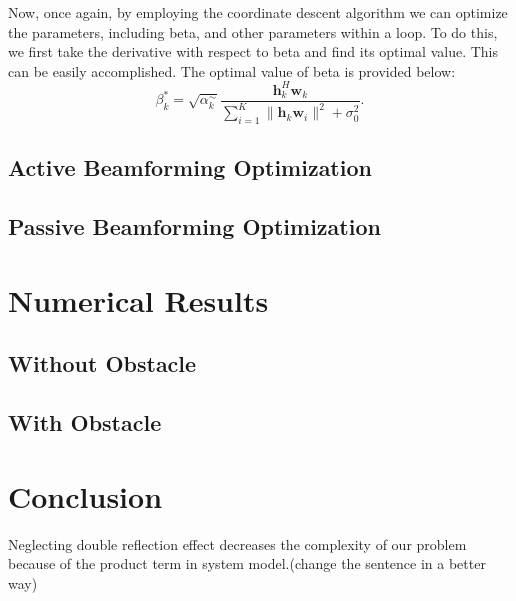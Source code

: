 \documentclass{article}
\begin{document}
Now, once again, by employing the coordinate descent algorithm we can optimize the parameters, including beta, and other parameters within a loop.
To do this, we first take the derivative with respect to beta and find its optimal value. This can be easily accomplished.
The optimal value of beta is provided below:
\[
\beta_k^* = \sqrt{\alpha_k^\sim} \frac{{\mathbf{h}_k^H \mathbf{w}_k}}{{\sum_{i=1}^{K} \lVert \mathbf{h}_k \mathbf{w}_i \rVert^2 + \sigma_0^2}}.
\]

\subsection{Active Beamforming Optimization}

\subsection{Passive Beamforming Optimization}

\section{Numerical Results}

\subsection{Without Obstacle}

\subsection{With Obstacle}

\section{Conclusion}
Neglecting double reflection effect decreases the complexity of our problem because of the product term in system model.(change the sentence in a better way)

%



\end{document}
